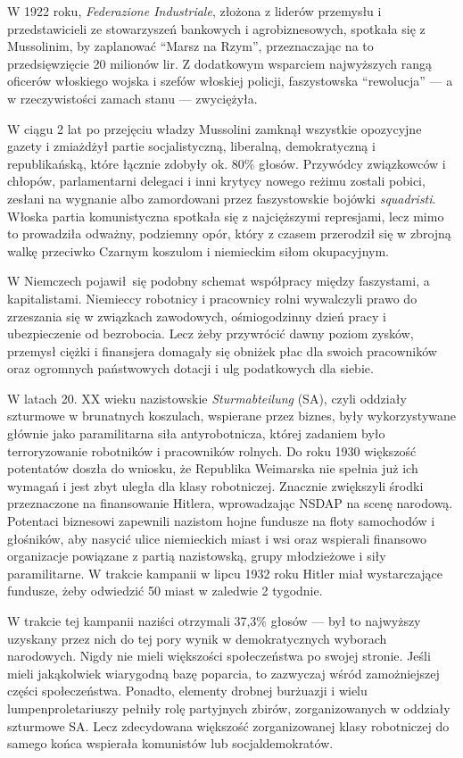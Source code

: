 \documentclass[12pt]{book}
\begin{document}
W 1922 roku, \textit{Federazione Industriale}, złożona z liderów przemysłu i przedstawicieli ze stowarzyszeń bankowych i agrobiznesowych, spotkała się z Mussolinim, by zaplanować ``Marsz na Rzym'', przeznaczając na to przedsięwzięcie 20 milionów lir. Z dodatkowym wsparciem najwyższych rangą oficerów włoskiego wojska i szefów włoskiej policji, faszystowska ``rewolucja'' — a w rzeczywistości zamach stanu — zwyciężyła.

W ciągu 2 lat po przejęciu władzy Mussolini zamknął wszystkie opozycyjne gazety i zmiażdżył partie socjalistyczną, liberalną, demokratyczną i republikańską, które łącznie zdobyły ok. 80\% głosów. Przywódcy związkowców i chłopów, parlamentarni delegaci i inni krytycy nowego reżimu zostali pobici, zesłani na wygnanie albo zamordowani przez faszystowskie bojówki \textit{squadristi}. Włoska partia komunistyczna spotkała się z najcięższymi represjami, lecz mimo to prowadziła odważny, podziemny opór, który z czasem przerodził się w zbrojną walkę przeciwko Czarnym koszulom i niemieckim siłom okupacyjnym.

W Niemczech pojawił się podobny schemat współpracy między faszystami, a kapitalistami. Niemieccy robotnicy i pracownicy rolni wywalczyli prawo do zrzeszania się w związkach zawodowych, ośmiogodzinny dzień pracy i ubezpieczenie od bezrobocia. Lecz żeby przywrócić dawny poziom zysków, przemysł ciężki i finansjera domagały się obniżek płac dla swoich pracowników oraz ogromnych państwowych dotacji i ulg podatkowych dla siebie.

W latach 20. XX wieku nazistowskie \textit{Sturmabteilung} (SA), czyli oddziały szturmowe w brunatnych koszulach, wspierane przez biznes, były wykorzystywane głównie jako paramilitarna siła antyrobotnicza, której zadaniem było terroryzowanie robotników i pracowników rolnych. Do roku 1930 większość potentatów doszła do wniosku, że Republika Weimarska nie spełnia już ich wymagań i jest zbyt uległa dla klasy robotniczej. Znacznie zwiększyli środki przeznaczone na finansowanie Hitlera, wprowadzając NSDAP na scenę narodową. Potentaci biznesowi zapewnili nazistom hojne fundusze na floty samochodów i głośników, aby nasycić ulice niemieckich miast i wsi oraz wspierali finansowo organizacje powiązane z partią nazistowską, grupy młodzieżowe i siły paramilitarne. W trakcie kampanii w lipcu 1932 roku Hitler miał wystarczające fundusze, żeby odwiedzić 50 miast w zaledwie 2 tygodnie.

W trakcie tej kampanii naziści otrzymali 37,3\% głosów — był to najwyższy uzyskany przez nich do tej pory wynik w demokratycznych wyborach narodowych. Nigdy nie mieli większości społeczeństwa po swojej stronie. Jeśli mieli jakąkolwiek wiarygodną bazę poparcia, to zazwyczaj wśród zamożniejszej części społeczeństwa. Ponadto, elementy drobnej burżuazji i wielu lumpenproletariuszy pełniły rolę partyjnych zbirów, zorganizowanych w oddziały szturmowe SA. Lecz zdecydowana większość zorganizowanej klasy robotniczej do samego końca wspierała komunistów lub socjaldemokratów.
\end{document}
